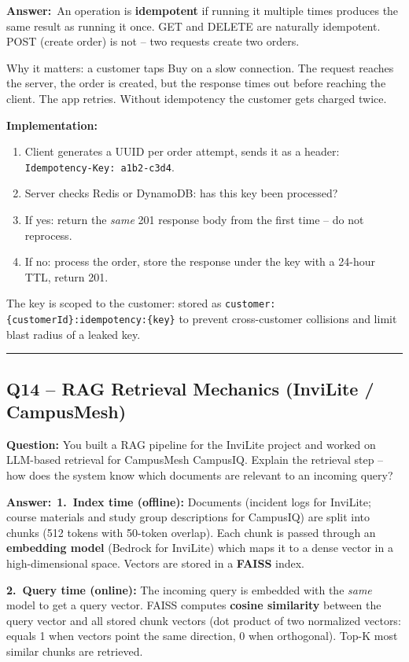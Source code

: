 \documentclass[letterpaper,10pt]{article}
\newlength{\boxwidth}
\newcommand{\questionbox}[1]{%
  \vspace{6pt}%
  \noindent\colorbox{qbg}{%
    \begin{minipage}{\boxwidth}%
      \vspace{3pt}\textbf{\textcolor{nordblue}{Question:}} #1\vspace{3pt}%
    \end{minipage}%
  }\vspace{2pt}%
}
\newcommand{\answerlabel}{\noindent\textbf{\textcolor{answerblue}{Answer:}}~}
\begin{document}
\answerlabel An operation is \textbf{idempotent} if running it multiple times produces the same result as running it once. GET and DELETE are naturally idempotent. POST (create order) is not -- two requests create two orders.

Why it matters: a customer taps Buy on a slow connection. The request reaches the server, the order is created, but the response times out before reaching the client. The app retries. Without idempotency the customer gets charged twice.

\textbf{Implementation:}
\begin{enumerate}[leftmargin=*, itemsep=0pt]
  \item Client generates a UUID per order attempt, sends it as a header: \texttt{Idempotency-Key: a1b2-c3d4}.
  \item Server checks Redis or DynamoDB: has this key been processed?
  \item If yes: return the \textit{same} 201 response body from the first time -- do not reprocess.
  \item If no: process the order, store the response under the key with a 24-hour TTL, return 201.
\end{enumerate}

The key is scoped to the customer: stored as \texttt{customer:\{customerId\}:idempotency:\{key\}} to prevent cross-customer collisions and limit blast radius of a leaked key.

\medskip\rule{\linewidth}{0.2pt}

\subsection*{Q14 -- RAG Retrieval Mechanics (InviLite / CampusMesh)}

\questionbox{You built a RAG pipeline for the InviLite project and worked on LLM-based retrieval for CampusMesh CampusIQ. Explain the retrieval step -- how does the system know which documents are relevant to an incoming query?}

\answerlabel \textbf{1.~Index time (offline):} Documents (incident logs for InviLite; course materials and study group descriptions for CampusIQ) are split into chunks (512 tokens with 50-token overlap). Each chunk is passed through an \textbf{embedding model} (Bedrock for InviLite) which maps it to a dense vector in a high-dimensional space. Vectors are stored in a \textbf{FAISS} index.

\textbf{2.~Query time (online):} The incoming query is embedded with the \textit{same} model to get a query vector. FAISS computes \textbf{cosine similarity} between the query vector and all stored chunk vectors (dot product of two normalized vectors: equals 1 when vectors point the same direction, 0 when orthogonal). Top-K most similar chunks are retrieved.
\end{document}
